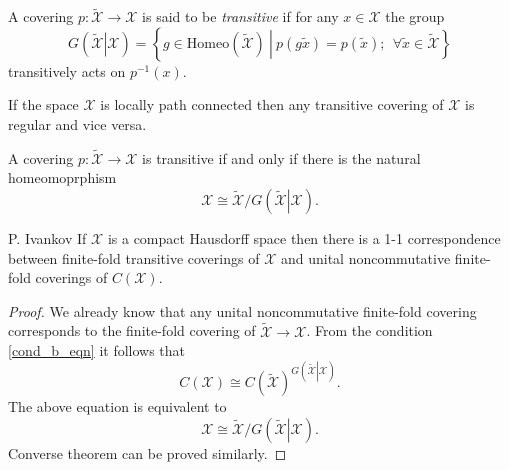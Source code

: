 \documentclass{beamer}
\theoremstyle{plain}
\begin{document}
\begin{frame}

\begin{definition}
	A covering $ p:\widetilde{\mathcal  X}\to \mathcal  X$ is said to be \textit{transitive} if for any $x \in \mathcal  X$ the group
	$$
	G\left(\left.\widetilde{\mathcal  X} \right|\mathcal  X\right)= \left\{ \left.g \in \text{Homeo}\left(\widetilde{\mathcal X} \right)~\right|~ p(g\widetilde{x}) = p(\widetilde{x});~~\forall \widetilde{x} \in \widetilde{\mathcal  X}\right\} 
	$$
	transitively acts on $p^{-1}\left(x\right)$.
\end{definition}
\begin{fact}
	If the space $ \mathcal  X$ is locally path connected then any transitive covering  of $ \mathcal  X$  is regular and vice versa.
\end{fact}
\begin{fact}
	A covering $ p:\widetilde{\mathcal  X}\to \mathcal  X$ is {transitive} if and only if there is the natural homeomoprphism
	$$
\mathcal  X \cong \widetilde{\mathcal  X}/		G\left(\left.\widetilde{\mathcal  X} \right|\mathcal  X\right).
	$$
	
\end{fact}
\end{frame}
\begin{frame}
\begin{lemma}
	\alert{P. Ivankov}
	If $\mathcal  X$ is a compact Hausdorff space then there is a 1-1 correspondence between finite-fold transitive coverings of $\mathcal  X$ and unital noncommutative finite-fold  coverings of $C\left(\mathcal  X\right)$.
\end{lemma}

\begin{proof}
We already know that any  unital noncommutative finite-fold  covering corresponds to the finite-fold covering of $\widetilde{\mathcal  X}\to \mathcal  X$.  From the condition \eqref{cond_b_eqn} it follows that
$$
C\left(\mathcal  X\right)\cong C\left(\widetilde{\mathcal  X}\right)^{G\left(\left.\widetilde{\mathcal  X} \right|\mathcal  X\right)}.
$$
The above equation is equivalent to
$$
{\mathcal  X}\cong\widetilde{\mathcal  X}/ G\left(\left.\widetilde{\mathcal  X} \right|\mathcal  X\right).
$$
Converse theorem can be proved similarly.
\end{proof}
\end{frame}
\end{document}
